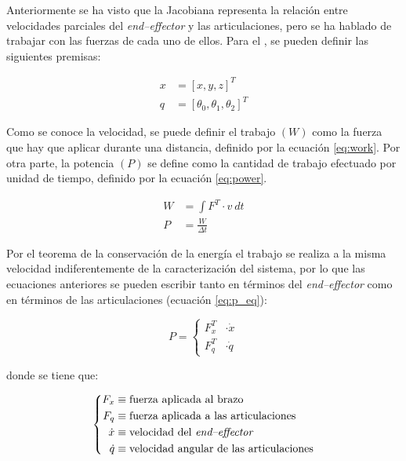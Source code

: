 Anteriormente se ha visto que la Jacobiana representa la relación entre velocidades
parciales del \textit{end--effector} y las articulaciones, pero se ha hablado de trabajar
con las fuerzas de cada uno de ellos. Para el \pArm{}, se pueden definir las siguientes
premisas:

\begin{align*}
    x &= \left[x, y, z\right]^T \\
    q &= \left[\theta_0, \theta_1, \theta_2\right]^T
\end{align*}

Como se conoce la velocidad, se puede definir el trabajo $\left(W\right)$ como la fuerza
que hay que aplicar durante una distancia, definido por la ecuación \ref{eq:work}. Por
otra parte, la potencia $\left(P\right)$ se define como la cantidad de trabajo efectuado
por unidad de tiempo\cite{PotenciaFisica2020}, definido por la ecuación \ref{eq:power}.

\begin{align}
    W &= \int{F^T \cdot v~dt} \label{eq:work} \\[1ex]
    P &= \frac{W}{\varDelta t} \label{eq:power}
\end{align}

Por el teorema de la conservación de la energía el trabajo se realiza a la misma
velocidad indiferentemente de la caracterización del sistema, por lo que las ecuaciones
anteriores se pueden escribir tanto en términos del \textit{end--effector}
como en términos de las articulaciones (ecuación \ref{eq:p_eq}):

\begin{equation}\label{eq:p_eq}
    P = \left\{\begin{aligned}
        F^T_x & \cdot \dot{x} \\
        F^T_q & \cdot \dot{q} 
    \end{aligned}\right.
\end{equation}

donde se tiene que:

\begin{equation*}
    \left\{\begin{aligned}
        F_x & \equiv \text{fuerza aplicada al brazo} \\
        F_q & \equiv \text{fuerza aplicada a las articulaciones} \\
        \dot{x} & \equiv \text{velocidad del \textit{end--effector}} \\
        \dot{q} & \equiv \text{velocidad angular de las articulaciones}
    \end{aligned}\right.
\end{equation*}

